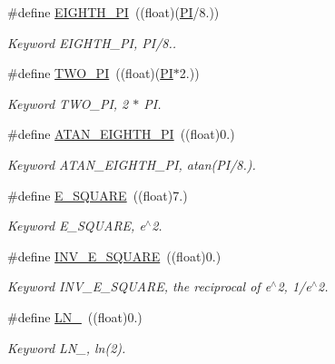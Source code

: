 \begin{DoxyCompactItemize}
\mbox{\label{a00023_a4e8f7fbed3cb3e8e3636300b37e2dbb3}} 
\#define \mbox{\hyperlink{a00023_a4e8f7fbed3cb3e8e3636300b37e2dbb3}{E\+I\+G\+H\+T\+H\+\_\+\+PI}}~((float)(\mbox{\hyperlink{a00023_a598a3330b3c21701223ee0ca14316eca}{PI}}/8.))
\begin{DoxyCompactList}\small\item\em Keyword E\+I\+G\+H\+T\+H\+\_\+\+PI, P\+I/8.. \end{DoxyCompactList}\item 
\mbox{\label{a00023_a3b947f4b635461030ff2d87833e5049e}} 
\#define \mbox{\hyperlink{a00023_a3b947f4b635461030ff2d87833e5049e}{T\+W\+O\+\_\+\+PI}}~((float)(\mbox{\hyperlink{a00023_a598a3330b3c21701223ee0ca14316eca}{PI}}$\ast$2.))
\begin{DoxyCompactList}\small\item\em Keyword T\+W\+O\+\_\+\+PI, 2 $\ast$ PI. \end{DoxyCompactList}\item 
\mbox{\label{a00023_a5c8eebe5b0dbd390778ec30422eee7e8}} 
\#define \mbox{\hyperlink{a00023_a5c8eebe5b0dbd390778ec30422eee7e8}{A\+T\+A\+N\+\_\+\+E\+I\+G\+H\+T\+H\+\_\+\+PI}}~((float)0.)
\begin{DoxyCompactList}\small\item\em Keyword A\+T\+A\+N\+\_\+\+E\+I\+G\+H\+T\+H\+\_\+\+PI, atan(P\+I/8.). \end{DoxyCompactList}\item 
\mbox{\label{a00023_a09ca0c42bed2331f570a1b64c7cdee3e}} 
\#define \mbox{\hyperlink{a00023_a09ca0c42bed2331f570a1b64c7cdee3e}{E\+\_\+\+S\+Q\+U\+A\+RE}}~((float)7.)
\begin{DoxyCompactList}\small\item\em Keyword E\+\_\+\+S\+Q\+U\+A\+RE, e$^\wedge$2. \end{DoxyCompactList}\item 
\mbox{\label{a00023_ae6adbf51b830cf254970e774bf5f809a}} 
\#define \mbox{\hyperlink{a00023_ae6adbf51b830cf254970e774bf5f809a}{I\+N\+V\+\_\+\+E\+\_\+\+S\+Q\+U\+A\+RE}}~((float)0.)
\begin{DoxyCompactList}\small\item\em Keyword I\+N\+V\+\_\+\+E\+\_\+\+S\+Q\+U\+A\+RE, the reciprocal of e$^\wedge$2, 1/e$^\wedge$2. \end{DoxyCompactList}\item 
\mbox{\label{a00023_aa94d5c40b9f567f0bb88c23634f9d106}} 
\#define \mbox{\hyperlink{a00023_aa94d5c40b9f567f0bb88c23634f9d106}{L\+N\+\_}}~((float)0.)
\begin{DoxyCompactList}\small\item\em Keyword L\+N\+\_, ln(2). \end{DoxyCompactList}\end{DoxyCompactItemize}
